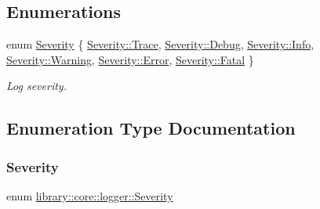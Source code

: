 \subsection*{Enumerations}
\begin{DoxyCompactItemize}
\item 
enum \mbox{\hyperlink{namespacelibrary_1_1core_1_1logger_a35f71353edf64f68f7fe3874b01abaa8}{Severity}} \{ \newline
\mbox{\hyperlink{namespacelibrary_1_1core_1_1logger_a35f71353edf64f68f7fe3874b01abaa8add4ec0ac4e58f7c32a01244ae91150b1}{Severity\+::\+Trace}}, 
\mbox{\hyperlink{namespacelibrary_1_1core_1_1logger_a35f71353edf64f68f7fe3874b01abaa8aa603905470e2a5b8c13e96b579ef0dba}{Severity\+::\+Debug}}, 
\mbox{\hyperlink{namespacelibrary_1_1core_1_1logger_a35f71353edf64f68f7fe3874b01abaa8a4059b0251f66a18cb56f544728796875}{Severity\+::\+Info}}, 
\mbox{\hyperlink{namespacelibrary_1_1core_1_1logger_a35f71353edf64f68f7fe3874b01abaa8a0eaadb4fcb48a0a0ed7bc9868be9fbaa}{Severity\+::\+Warning}}, 
\newline
\mbox{\hyperlink{namespacelibrary_1_1core_1_1logger_a35f71353edf64f68f7fe3874b01abaa8a902b0d55fddef6f8d651fe1035b7d4bd}{Severity\+::\+Error}}, 
\mbox{\hyperlink{namespacelibrary_1_1core_1_1logger_a35f71353edf64f68f7fe3874b01abaa8a882384ec38ce8d9582b57e70861730e4}{Severity\+::\+Fatal}}
 \}
\begin{DoxyCompactList}\small\item\em Log severity. \end{DoxyCompactList}\end{DoxyCompactItemize}


\subsection{Enumeration Type Documentation}
\mbox{\label{namespacelibrary_1_1core_1_1logger_a35f71353edf64f68f7fe3874b01abaa8}} 
\subsubsection{\texorpdfstring{Severity}{Severity}}
{\footnotesize\ttfamily enum \mbox{\hyperlink{namespacelibrary_1_1core_1_1logger_a35f71353edf64f68f7fe3874b01abaa8}{library\+::core\+::logger\+::\+Severity}}\hspace{0.3cm}{\ttfamily [strong]}}




